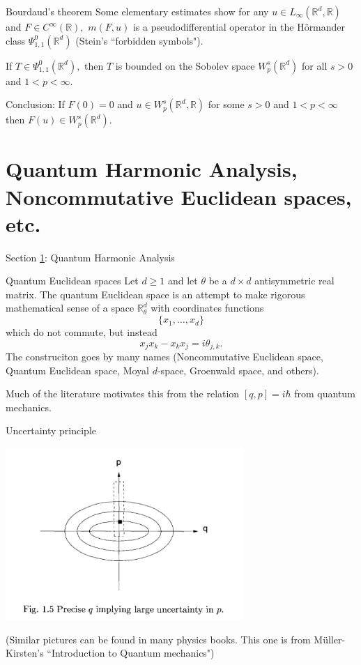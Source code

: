 \documentclass{beamer}
\numberwithin{equation}{section}
\theoremstyle{plain}
\theoremstyle{plain}
\theoremstyle{definition}
\theoremstyle{plain}
\theoremstyle{plain}
\theoremstyle{definition}
\newcommand{\Rl}{\mathbb{R}}
\begin{document}
\begin{frame}{Bourdaud's theorem}
    Some elementary estimates show for any $u\in L_{\infty}(\Rl^d,\Rl)$ and $F\in C^\infty(\Rl),$ $m(F,u)$ is a pseudodifferential operator in the H\"ormander class $\Psi^0_{1,1}(\Rl^d)$ (Stein's ``forbidden symbols").

    \begin{theorem}[Bourdaud (1988)]
        If $T \in \Psi^0_{1,1}(\Rl^d),$ then $T$ is bounded on the Sobolev space $W^s_p(\Rl^d)$ for all $s>0$ and $1<p<\infty.$
    \end{theorem}
\pause
    Conclusion: If $F(0)=0$ and $u\in W^s_p(\Rl^d,\Rl)$ for some $s>0$ and $1<p<\infty$ then $F(u)\in W^s_p(\Rl^d).$
\end{frame}

\section{Quantum Harmonic Analysis, Noncommutative Euclidean spaces, etc.}\label{qha_section}

\begin{frame}
    \Huge{Section \ref{qha_section}: Quantum Harmonic Analysis}
\end{frame}


\begin{frame}{Quantum Euclidean spaces}
    Let $d\geq 1$ and let $\theta$ be a $d\times d$ antisymmetric real matrix. The quantum Euclidean space is an attempt to make rigorous mathematical sense of a space $\Rl^d_\theta$ with coordinates functions
    \[
        \{x_1,\ldots,x_d\}
    \]
    which do not commute, but instead
    \[
        x_jx_k-x_kx_j = i\theta_{j,k}.
    \]
    The construciton goes by many names (Noncommutative Euclidean space, Quantum Euclidean space, Moyal $d$-space, Groenwald space, and others).\pause

    Much of the literature motivates this from the relation $[q,p]=i\hbar$ from quantum mechanics.
\end{frame}

\begin{frame}{Uncertainty principle}
\begin{center}
    \includegraphics[width=90mm]{muller-kirsten-uncertainty.png}
\end{center}
(Similar pictures can be found in many physics books. This one is from M\"uller-Kirsten's ``Introduction to Quantum mechanics")
\end{frame}
\end{document}
